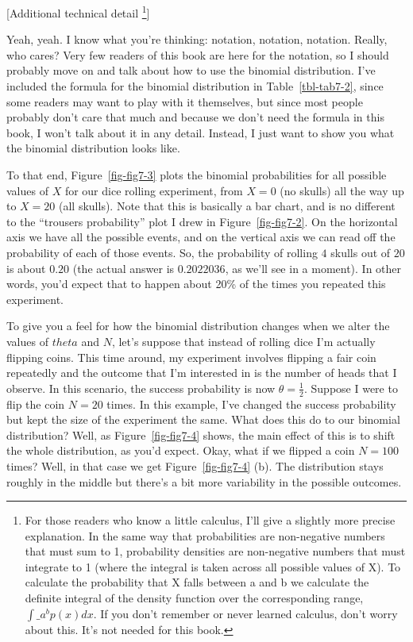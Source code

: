 \documentclass[
  letterpaper,
]{book}
\begin{document}
{[}Additional technical detail \footnote{For those readers who know a
  little calculus, I'll give a slightly more precise explanation. In the
  same way that probabilities are non-negative numbers that must sum to
  1, probability densities are non-negative numbers that must integrate
  to 1 (where the integral is taken across all possible values of X). To
  calculate the probability that X falls between a and b we calculate
  the definite integral of the density function over the corresponding
  range, \(\int\_{a}^{b} p(x) dx\). If you don't remember or never
  learned calculus, don't worry about this. It's not needed for this
  book.}{]}

Yeah, yeah. I know what you're thinking: notation, notation, notation.
Really, who cares? Very few readers of this book are here for the
notation, so I should probably move on and talk about how to use the
binomial distribution. I've included the formula for the binomial
distribution in Table~\ref{tbl-tab7-2}, since some readers may want to
play with it themselves, but since most people probably don't care that
much and because we don't need the formula in this book, I won't talk
about it in any detail. Instead, I just want to show you what the
binomial distribution looks like.

To that end, Figure~\ref{fig-fig7-3} plots the binomial probabilities
for all possible values of \(X\) for our dice rolling experiment, from
\(X = 0\) (no skulls) all the way up to \(X = 20\) (all skulls). Note
that this is basically a bar chart, and is no different to the
``trousers probability'' plot I drew in Figure~\ref{fig-fig7-2}. On the
horizontal axis we have all the possible events, and on the vertical
axis we can read off the probability of each of those events. So, the
probability of rolling \(4\) skulls out of \(20\) is about \(0.20\) (the
actual answer is \(0.2022036\), as we'll see in a moment). In other
words, you'd expect that to happen about 20\% of the times you repeated
this experiment.

To give you a feel for how the binomial distribution changes when we
alter the values of \(theta\) and \(N\), let's suppose that instead of
rolling dice I'm actually flipping coins. This time around, my
experiment involves flipping a fair coin repeatedly and the outcome that
I'm interested in is the number of heads that I observe. In this
scenario, the success probability is now \(\theta = \frac{1}{2}\).
Suppose I were to flip the coin \(N = 20\) times. In this example, I've
changed the success probability but kept the size of the experiment the
same. What does this do to our binomial distribution? Well, as
Figure~\ref{fig-fig7-4} shows, the main effect of this is to shift the
whole distribution, as you'd expect. Okay, what if we flipped a coin
\(N = 100\) times? Well, in that case we get Figure~\ref{fig-fig7-4}
(b). The distribution stays roughly in the middle but there's a bit more
variability in the possible outcomes.
\end{document}
